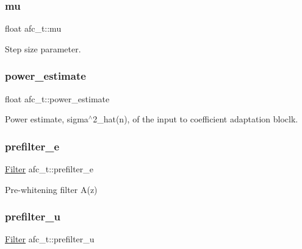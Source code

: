 \subsubsection{\texorpdfstring{mu}{mu}}
{\footnotesize\ttfamily float afc\+\_\+t\+::mu}



Step size parameter. 

\mbox{\label{structafc__t_ab94a0e3f15733272ecd739279e132818}} 
\subsubsection{\texorpdfstring{power\+\_\+estimate}{power\_estimate}}
{\footnotesize\ttfamily float afc\+\_\+t\+::power\+\_\+estimate}



Power estimate, sigma$^\wedge$2\+\_\+hat(n), of the input to coefficient adaptation bloclk. 

\mbox{\label{structafc__t_a67b0483fc918fc9af5cb64c6b79e41cf}} 
\subsubsection{\texorpdfstring{prefilter\+\_\+e}{prefilter\_e}}
{\footnotesize\ttfamily \mbox{\hyperlink{filter_8h_a69e34b8aa259d2ca0b81b5c95f395bdf}{Filter}} afc\+\_\+t\+::prefilter\+\_\+e}



Pre-\/whitening filter A(z) 

\mbox{\label{structafc__t_a43d15e690ac1c74461c8b8a5522d8e52}} 
\subsubsection{\texorpdfstring{prefilter\+\_\+u}{prefilter\_u}}
{\footnotesize\ttfamily \mbox{\hyperlink{filter_8h_a69e34b8aa259d2ca0b81b5c95f395bdf}{Filter}} afc\+\_\+t\+::prefilter\+\_\+u}




